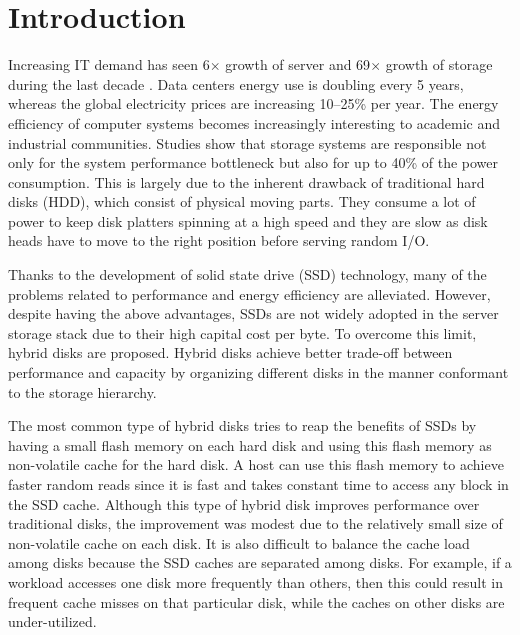 \section{Introduction}
\label{intro}


Increasing IT demand has seen 6$\times$ growth of server and
69$\times$ growth of storage during the last decade
\cite{ibm_green_beyond}. Data centers energy use is doubling every 5
years, whereas the global electricity prices are increasing 10--25\%
per year. The energy efficiency of computer systems becomes
increasingly interesting to academic and industrial communities.
Studies show that storage systems are responsible not only for the
system performance bottleneck but also for up to 40\% of the power
consumption\cite{storage_40}. This is largely due to the inherent
drawback of traditional hard disks (HDD), which consist of physical
moving parts. They consume a lot of power to keep disk platters
spinning at a high speed and they are slow as disk heads have to move
to the right position before serving random I/O.

Thanks to the development of solid state drive (SSD) technology, many
of the problems related to performance and energy efficiency are
alleviated. However, despite having the above advantages, SSDs are
not widely adopted in the server storage stack due to their high
capital cost per byte. To overcome this limit, hybrid disks are
proposed. Hybrid disks achieve better trade-off between performance
and capacity by organizing different disks in the manner conformant to
the storage hierarchy. 


The most common type of hybrid disks \cite{Bisson07ahybrid} tries to
reap the benefits of SSDs by having a small flash memory on each hard
disk and using this flash memory as \mbox{non-volatile} cache for the
hard disk. A host can use this flash memory to achieve faster random
reads since it is fast and takes constant time to access any block in
the SSD cache. Although this type of hybrid disk improves performance
over traditional disks, the improvement was modest due to the
relatively small size of \mbox{non-volatile} cache on each disk.  It
is also difficult to balance the cache load among disks because the
SSD caches are separated among disks. For example, if a workload
accesses one disk more frequently than others, then this could result
in frequent cache misses on that particular disk, while the caches on
other disks are under-utilized. 

